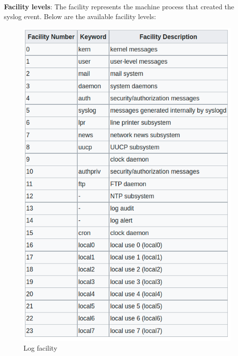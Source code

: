 \begin{flushleft}
\textbf{Facility levels}:
The facility represents the machine process that created the syslog event. Below are the available facility levels:
\begin{figure}[h!]
	\centering
	\includegraphics[scale=0.4]{content/chapter16/images/facility.png}
	\caption{Log facility}
	\label{fig:facility}
\end{figure}

\newpage


\end{flushleft}

